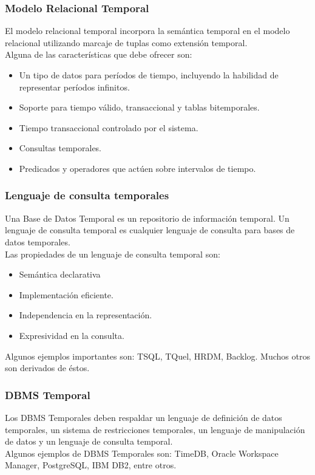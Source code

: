 \documentclass[a4paper,12pt,oneside]{report}
\begin{document}
\subsubsection*{Modelo Relacional Temporal}
El modelo relacional temporal incorpora la sem\'antica temporal en el modelo relacional utilizando marcaje de tuplas como extensi\'on temporal.\\
Alguna de las caracter\'isticas que debe ofrecer son:
\begin{itemize}
\item Un tipo de datos para per\'iodos de tiempo, incluyendo la habilidad de representar per\'iodos infinitos.
\item Soporte para tiempo v\'alido, transaccional y tablas bitemporales.
\item Tiempo transaccional controlado por el sistema.
\item Consultas temporales.
\item Predicados y operadores que act\'uen sobre intervalos de tiempo.
\end{itemize}
\subsubsection*{Lenguaje de consulta temporales}
Una Base de Datos Temporal es un repositorio de informaci\'on temporal. Un lenguaje de consulta temporal es cualquier lenguaje de consulta para bases de datos temporales.\\
Las propiedades de un lenguaje de consulta temporal son:
\begin{itemize}
\item Sem\'antica declarativa
\item Implementaci\'on eficiente.
\item Independencia en la representaci\'on.
\item Expresividad en la consulta.
\end{itemize}
Algunos ejemplos importantes son: TSQL, TQuel, HRDM, Backlog. Muchos otros son derivados de \'estos.
\subsubsection*{DBMS Temporal}
Los DBMS Temporales deben respaldar un lenguaje de definici\'on de datos temporales, un sistema de restricciones temporales, un lenguaje de manipulaci\'on de datos y un lenguaje de consulta temporal.\\
Algunos ejemplos de DBMS Temporales son: TimeDB, Oracle Workspace Manager, PostgreSQL, IBM DB2, entre otros.
\end{document}
